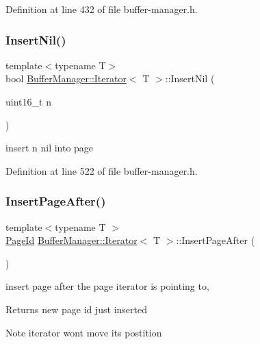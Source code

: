 Definition at line 432 of file buffer-\/manager.\+h.

\mbox{\label{class_buffer_manager_1_1_iterator_aee5637c96ddb7c5fef0f9a12d133c7c8}} 
\subsubsection{\texorpdfstring{InsertNil()}{InsertNil()}}
{\footnotesize\ttfamily template$<$typename T$>$ \\
bool \mbox{\hyperlink{class_buffer_manager_1_1_iterator}{Buffer\+Manager\+::\+Iterator}}$<$ T $>$\+::Insert\+Nil (\begin{DoxyParamCaption}\item[{uint16\+\_\+t}]{n }\end{DoxyParamCaption})\hspace{0.3cm}{\ttfamily [inline]}}

insert n nil into page 

Definition at line 522 of file buffer-\/manager.\+h.

\mbox{\label{class_buffer_manager_1_1_iterator_affb973bacb2deef1704e20221fb3c3fb}} 
\subsubsection{\texorpdfstring{InsertPageAfter()}{InsertPageAfter()}}
{\footnotesize\ttfamily template$<$typename T $>$ \\
\mbox{\hyperlink{struct_generic_i_o_id}{Page\+Id}} \mbox{\hyperlink{class_buffer_manager_1_1_iterator}{Buffer\+Manager\+::\+Iterator}}$<$ T $>$\+::Insert\+Page\+After (\begin{DoxyParamCaption}{ }\end{DoxyParamCaption})\hspace{0.3cm}{\ttfamily [inline]}}

insert page after the page iterator is pointing to, \begin{DoxyReturn}{Returns}
new page id just inserted 
\end{DoxyReturn}
\begin{DoxyNote}{Note}
iterator won\textquotesingle{}t move it\textquotesingle{}s postition 
\end{DoxyNote}


